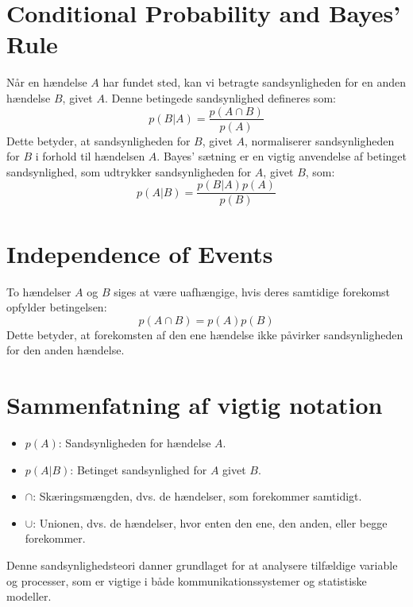 \documentclass[a4paper,12pt]{book}
\begin{document}
	\section{Conditional Probability and Bayes' Rule}
	
	Når en hændelse \( A \) har fundet sted, kan vi betragte sandsynligheden for en anden hændelse \( B \), givet \( A \). Denne betingede sandsynlighed defineres som:
	\[
	p(B|A) = \frac{p(A \cap B)}{p(A)}
	\]
	Dette betyder, at sandsynligheden for \( B \), givet \( A \), normaliserer sandsynligheden for \( B \) i forhold til hændelsen \( A \). Bayes' sætning er en vigtig anvendelse af betinget sandsynlighed, som udtrykker sandsynligheden for \( A \), givet \( B \), som:
	\[
	p(A|B) = \frac{p(B|A)p(A)}{p(B)}
	\]
	
	\section{Independence of Events}
	
	To hændelser \( A \) og \( B \) siges at være uafhængige, hvis deres samtidige forekomst opfylder betingelsen:
	\[
	p(A \cap B) = p(A)p(B)
	\]
	Dette betyder, at forekomsten af den ene hændelse ikke påvirker sandsynligheden for den anden hændelse.
	
	\section{Sammenfatning af vigtig notation}
	
	\begin{itemize}
		\item \( p(A) \): Sandsynligheden for hændelse \( A \).
		\item \( p(A|B) \): Betinget sandsynlighed for \( A \) givet \( B \).
		\item \( \cap \): Skæringsmængden, dvs. de hændelser, som forekommer samtidigt.
		\item \( \cup \): Unionen, dvs. de hændelser, hvor enten den ene, den anden, eller begge forekommer.
	\end{itemize}
	
	Denne sandsynlighedsteori danner grundlaget for at analysere tilfældige variable og processer, som er vigtige i både kommunikationssystemer og statistiske modeller.
	
\end{document}
